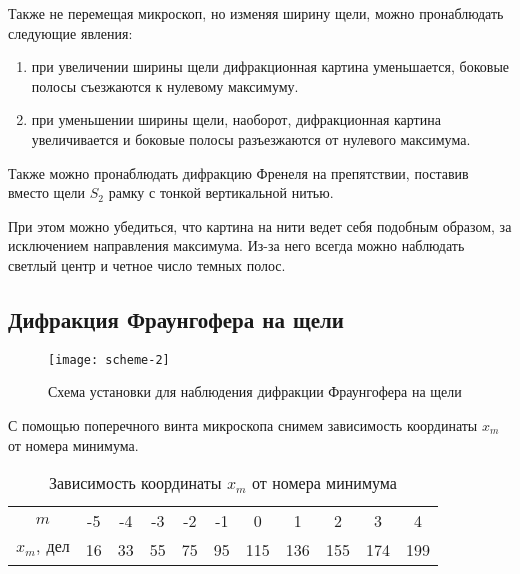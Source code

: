 \documentclass{lab}
\begin{document}
Также не перемещая микроскоп, но изменяя ширину щели, можно пронаблюдать следующие явления:

\begin{enumerate}
	\item при увеличении ширины щели дифракционная картина уменьшается, боковые полосы съезжаются к нулевому максимуму.
	
	\item при уменьшении ширины щели, наоборот, дифракционная картина увеличивается и боковые полосы разъезжаются от нулевого максимума.
\end{enumerate}

Также можно пронаблюдать дифракцию Френеля на препятствии, поставив вместо щели $ S_2 $ рамку с тонкой вертикальной нитью.

При этом можно убедиться, что картина на нити ведет себя подобным образом, за исключением направления максимума. Из-за него всегда можно наблюдать светлый центр и четное число темных полос.

\subsection*{Дифракция Фраунгофера на щели}

\begin{figure}[H]
	\centering
	\texttt{[image: scheme-2]}
	\caption{Схема установки для наблюдения дифракции Фраунгофера на щели}
	\label{scheme-2}
\end{figure}

С помощью поперечного винта микроскопа снимем зависимость координаты $ x_m $ от номера минимума.
\begin{table}[H]
	\centering
	\begin{tabular}{|c|cccccccccc|}
		\hline
		$ m $ & -5 & -4 & -3 & -2 & -1 & 0 & 1 & 2 & 3 & 4 \\
		$ x_m,~дел $ & 16 & 33 & 55 & 75 & 95 & 115 & 136 & 155 & 174 & 199 \\ \hline
	\end{tabular}
	\caption{Зависимость координаты $ x_m $ от номера минимума}
	\label{tab-3}
\end{table}
\end{document}
